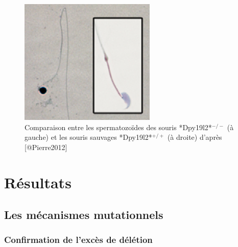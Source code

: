 \documentclass[12pt,twoside]{reedthesis}
\theoremstyle{definition}
\theoremstyle{definition}
\theoremstyle{remark}
\begin{document}
  \begin{figure}
  
  {\centering \includegraphics[scale=0.8]{figure/mouse_globo_spz} 
  
  }
  
  \caption[Comparaison entre les spermatozoïdes des souris *Dpy19l2*$^{-/-}$ (à gauche) et les souris sauvages *Dpy19l2*$^{+/+}$ (à droite)]{Comparaison entre les spermatozoïdes des souris *Dpy19l2*$^{-/-}$ (à gauche) et les souris sauvages *Dpy19l2*$^{+/+}$ (à droite) d'après [@Pierre2012]}\label{fig:mouseglobo}
  \end{figure}
  
  \newpage
  
  \section{Résultats}\label{resultats}
  
  \hypertarget{mecamut}{\subsection{Les mécanismes
  mutationnels}\label{mecamut}}
  
  \subsubsection{Confirmation de l'excès de
  délétion}\label{confirmation-de-lexces-de-deletion}
  
\end{document}

